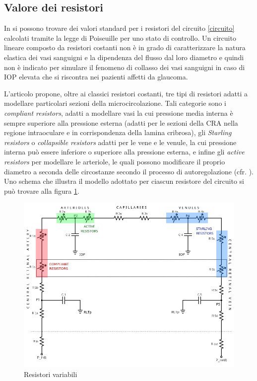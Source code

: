 \documentclass{article}
\begin{document}
\subsection{Valore dei resistori}

In \cite{art1} si possono trovare dei valori standard per i resistori del circuito \ref{circuito} calcolati tramite la legge di Poiseuille per uno stato di controllo.
Un circuito lineare composto da resistori costanti non è in grado di caratterizzare la natura elastica dei vasi sanguigni e la dipendenza del flusso dal loro diametro e quindi non è indicato per simulare il fenomeno di collasso dei vasi sanguigni in caso di IOP elevata che si riscontra nei pazienti affetti da glaucoma.

L'articolo \cite{art1} propone, oltre ai classici resistori costanti, tre tipi di resistori adatti a modellare particolari sezioni della microcircolazione.
Tali categorie sono i \textit{compliant resistors}, adatti a modellare vasi la cui pressione media interna è sempre superiore alla pressione esterna (adatti per le sezioni della CRA nella regione intraoculare e in corrispondenza della lamina cribrosa), gli \textit{Starling resistors} o \textit{collapsible resistors} adatti per le vene e le venule, la cui pressione interna può essere inferiore o superiore alla pressione esterna, e infine gli \textit{active resistors} per modellare le arteriole, le quali possono modificare il proprio diametro a seconda delle circostanze secondo il processo di autoregolazione (cfr. \cite{Tesi}). 
Uno schema che illustra il modello adottato per ciascun resistore del circuito si può trovare alla figura \ref{circuitocolori}.

\begin{figure}[h]
\begin{center}
\includegraphics[width=1.0\textwidth]{Pictures/circuit2.png}
\caption{Resistori variabili \cite{art1}}
\label{circuitocolori}
\end{center}
\end{figure}
\end{document}
